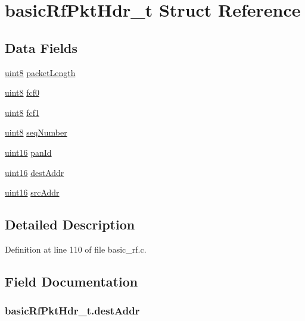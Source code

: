 \hypertarget{structbasic_rf_pkt_hdr__t}{
\section{basicRfPktHdr\_\-t Struct Reference}
\label{structbasic_rf_pkt_hdr__t}
}
\subsection*{Data Fields}
\begin{DoxyCompactItemize}
\item 
\hyperlink{hal__types_8h_adde6aaee8457bee49c2a92621fe22b79}{uint8} \hyperlink{structbasic_rf_pkt_hdr__t_a26b8a73b347a2110cfb1bab0bef83f69}{packetLength}
\item 
\hyperlink{hal__types_8h_adde6aaee8457bee49c2a92621fe22b79}{uint8} \hyperlink{structbasic_rf_pkt_hdr__t_a7876c1730d2584da13b6ab4f71a00f1c}{fcf0}
\item 
\hyperlink{hal__types_8h_adde6aaee8457bee49c2a92621fe22b79}{uint8} \hyperlink{structbasic_rf_pkt_hdr__t_abab1c726e43546c3d12ae520e0953c66}{fcf1}
\item 
\hyperlink{hal__types_8h_adde6aaee8457bee49c2a92621fe22b79}{uint8} \hyperlink{structbasic_rf_pkt_hdr__t_aaffb480584827f92ee83bf5d3146392f}{seqNumber}
\item 
\hyperlink{hal__types_8h_a05f6b0ae8f6a6e135b0e290c25fe0e4e}{uint16} \hyperlink{structbasic_rf_pkt_hdr__t_ac914da221dbe703a3a96204563232a7a}{panId}
\item 
\hyperlink{hal__types_8h_a05f6b0ae8f6a6e135b0e290c25fe0e4e}{uint16} \hyperlink{structbasic_rf_pkt_hdr__t_a82242467b7399cf53fcc80f73e7e09a3}{destAddr}
\item 
\hyperlink{hal__types_8h_a05f6b0ae8f6a6e135b0e290c25fe0e4e}{uint16} \hyperlink{structbasic_rf_pkt_hdr__t_a6eaff5d52b1bd0bca9050d9ce0b18144}{srcAddr}
\end{DoxyCompactItemize}


\subsection{Detailed Description}


Definition at line 110 of file basic\_\-rf.c.



\subsection{Field Documentation}
\hypertarget{structbasic_rf_pkt_hdr__t_a82242467b7399cf53fcc80f73e7e09a3}{
\subsubsection[{destAddr}]{ {\bf basicRfPktHdr\_\-t.destAddr}}}
\label{structbasic_rf_pkt_hdr__t_a82242467b7399cf53fcc80f73e7e09a3}



